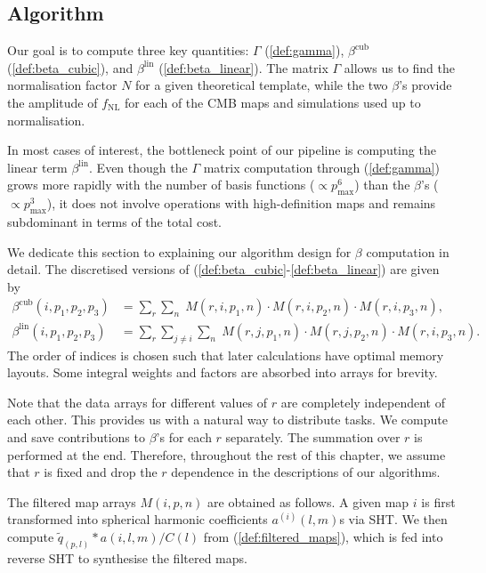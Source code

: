 \subsection{Algorithm}

Our goal is to compute three key quantities: $\Gamma$ (\ref{def:gamma}), $\beta^\text{cub}$ (\ref{def:beta_cubic}), and $\beta^\text{lin}$ (\ref{def:beta_linear}). The matrix $\Gamma$ allows us to find the normalisation factor $N$ for a given theoretical template, while the two $\beta$'s provide the amplitude of $f_\text{NL}$ for each of the CMB maps and simulations used up to normalisation.

In most cases of interest, the bottleneck point of our pipeline is computing the linear term $\beta^\text{lin}$. Even though the $\Gamma$ matrix computation through (\ref{def:gamma}) grows more rapidly with the number of basis functions ($\propto p_\text{max}^6$) than the $\beta$'s ($\propto p_\text{max}^3$), it does not involve operations with high-definition maps and remains subdominant in terms of the total cost.

We dedicate this section to explaining our algorithm design for $\beta$ computation in detail. The discretised versions of (\ref{def:beta_cubic}-\ref{def:beta_linear}) are given by
\begin{align}
	\beta^\text{cub}(i, p_1,p_2,p_3) &= \sum_r \sum_n \; M(r, i, p_1, n) \cdot M(r, i, p_2, n) \cdot M(r, i, p_3, n), \\
	\beta^\text{lin}(i, p_1,p_2,p_3) &= \sum_r \sum_{j \neq i} \sum_n \; M(r, j, p_1, n) \cdot M(r, j, p_2, n) \cdot M(r, i, p_3, n).
\end{align}
The order of indices is chosen such that later calculations have optimal memory layouts. Some integral weights and factors are absorbed into arrays for brevity.

Note that the data arrays for different values of $r$ are completely independent of each other. This provides us with a natural way to distribute tasks. We compute and save contributions to $\beta$'s for each $r$ separately. The summation over $r$ is performed at the end. Therefore, throughout the rest of this chapter, we assume that $r$ is fixed and drop the $r$ dependence in the descriptions of our algorithms.

The filtered map arrays $M(i,p,n)$ are obtained as follows. A given map $i$ is first transformed into spherical harmonic coefficients $a^{(i)}(l,m)$s via SHT. We then compute $\tilde{q}_(p,l) * a(i,l,m) / C(l)$ from (\ref{def:filtered_maps}), which is fed into reverse SHT to synthesise the filtered maps.

